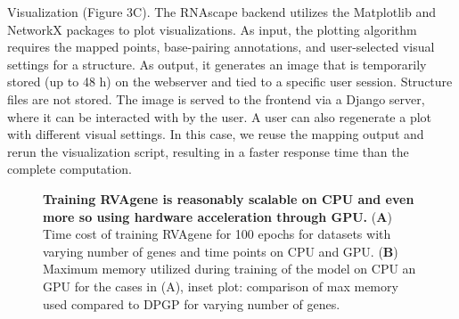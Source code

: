 Visualization (Figure 3C). The RNAscape backend utilizes the Matplotlib \citep{Hunter2007,} and NetworkX \citep{Hagberg2008} packages to plot visualizations. As input, the plotting algorithm requires the mapped points, base-pairing annotations, and user-selected visual settings for a structure. As output, it generates an image that is temporarily stored (up to 48 h) on the webserver and tied to a specific user session. Structure files are not stored. The image is served to the frontend via a Django \citep{Django2019} server, where it can be interacted with by the user. A user can also regenerate a plot with different visual settings. In this case, we reuse the mapping output and rerun the visualization script, resulting in a faster response time than the complete computation.
\begin{center}
    \begin{figure}
        \caption[Computational cost of training RVAgene]{\textbf{Training RVAgene is reasonably scalable on CPU and even more so using hardware acceleration through GPU.} ({\bf A}) Time cost of training RVAgene for 100 epochs for datasets with varying number of genes and time points on CPU and GPU. ({\bf B}) Maximum memory utilized during training of the model on CPU an GPU for the cases in (A), inset plot: comparison of max memory used compared to DPGP for varying number of genes.}
  \label{fig:rnascape2}
\end{figure}
\end{center}
